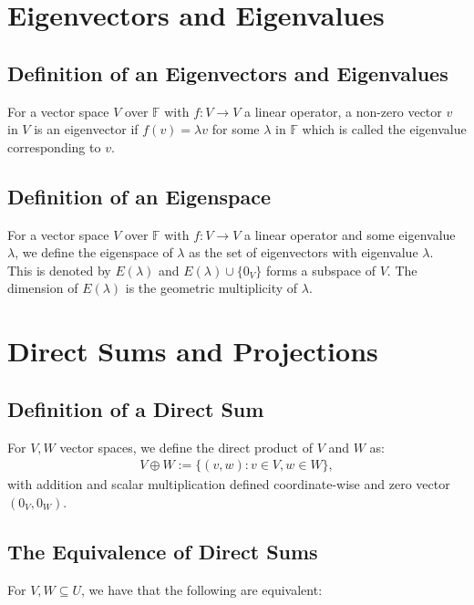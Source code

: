 \documentclass[a4paper, 12pt, twoside]{article}
\begin{document}
\section{Eigenvectors and Eigenvalues}

\subsection{Definition of an Eigenvectors and Eigenvalues}

For a vector space $V$ over $\mathbb{F}$ with $f: V \to V$ a 
linear operator, a non-zero vector $v$ in $V$ is an eigenvector
if $f(v) = \lambda v$ for some $\lambda$ in $\mathbb{F}$ which is
called the eigenvalue corresponding to $v$.

\subsection{Definition of an Eigenspace}

For a vector space $V$ over $\mathbb{F}$ with $f: V \to V$ a 
linear operator and some eigenvalue $\lambda$, we define the
eigenspace of $\lambda$ as the set of eigenvectors with eigenvalue
$\lambda$.
\\[\baselineskip]
This is denoted by $E(\lambda)$ and $E(\lambda)\cup\{0_{V}\}$ forms
a subspace of $V$. The dimension of $E(\lambda)$ is the geometric
multiplicity of $\lambda$.

\section{Direct Sums and Projections}

\subsection{Definition of a Direct Sum}

For $V, W$ vector spaces, we define the direct product of $V$ and
$W$ as: \begin{gather*}
  V \oplus W := \{(v, w) : v \in V, w \in W\},
\end{gather*} with addition and scalar multiplication defined
coordinate-wise and zero vector $(0_V, 0_W)$.

\subsection{The Equivalence of Direct Sums}
For $V, W \subseteq U$, we have that the following are equivalent:
\begin{itemize}
  \item $U = V \oplus W$
  \item Each element in $U$ can be written uniquely as the sum
  of elements in $V$ and $W$
  \item The map $f : V \oplus W \to U; (v, w) \mapsto v + w$ is
  isomorphism.
\end{itemize}
\end{document}
